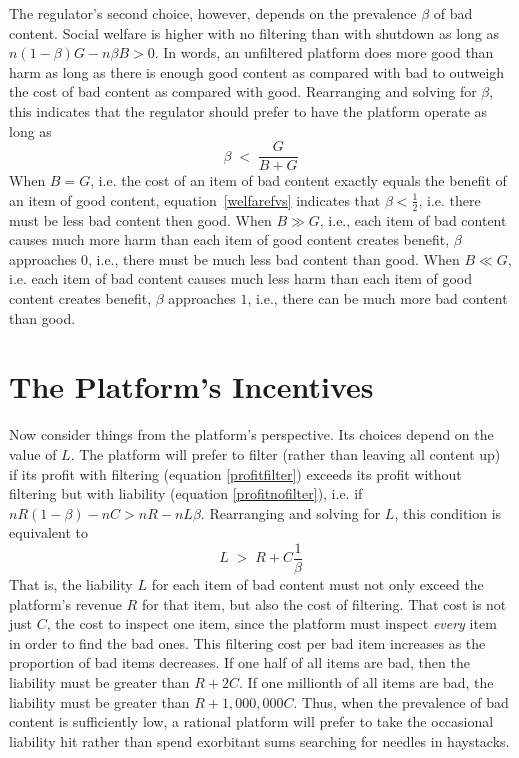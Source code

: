 The regulator's second choice, however, depends on the prevalence $\beta$ of bad content. Social welfare is higher with no filtering than with shutdown as long as $n(1-\beta)G - n \beta B > 0$. In words, an unfiltered platform does more good than harm as long as there is enough good content as compared with bad to outweigh the cost of bad content as compared with good. Rearranging and solving for $\beta$, this indicates that the regulator should prefer to have the platform operate as long as
\begin{equation}
\label{welfarefvs}
\beta \;<\; \frac{G}{B+G}
\end{equation}
When $B=G$, i.e. the cost of an item of bad content exactly equals the benefit of an item of good content, equation~\ref{welfarefvs} indicates that $\beta < \frac{1}{2}$, i.e. there must be less bad content then good. When $B \gg G$, i.e., each item of bad content causes much more harm than each item of good content creates benefit, $\beta$ approaches $0$, i.e., there must be much less bad content than good. When $B \ll G$, i.e. each item of bad content causes much less harm than each item of good content creates benefit, $\beta$ approaches $1$, i.e., there can be much more bad content than good.

\section{The Platform's Incentives}

Now consider things from the platform's perspective.  Its choices depend on the value of $L$. The platform will prefer to filter (rather than leaving all content up) if its profit with filtering (equation \ref{profitfilter}) exceeds its profit without filtering but with liability (equation \ref{profitnofilter}), i.e. if $nR(1 - \beta) - nC >  nR - nL\beta$. Rearranging and solving for $L$,  this condition is equivalent to 
\begin{equation}
\label{dofilter}
L \;>\; R + C\frac{1}{\beta}
\end{equation}
That is, the liability $L$ for each item of bad content must not only exceed the platform's revenue $R$ for that item, but also the cost of filtering. That cost is not just $C$, the cost to inspect one item, since the platform must inspect \emph{every} item in order to find the bad ones. This filtering cost per bad item increases as the proportion of bad items decreases. If one half of all items are bad, then the  liability must be greater than $R + 2C$. If one millionth of all items are bad, the liability must be greater than $R + 1,000,000C$. Thus, when the prevalence of bad content is sufficiently low, a rational platform  will prefer to take the occasional liability hit rather than spend exorbitant sums searching for needles in haystacks.  

